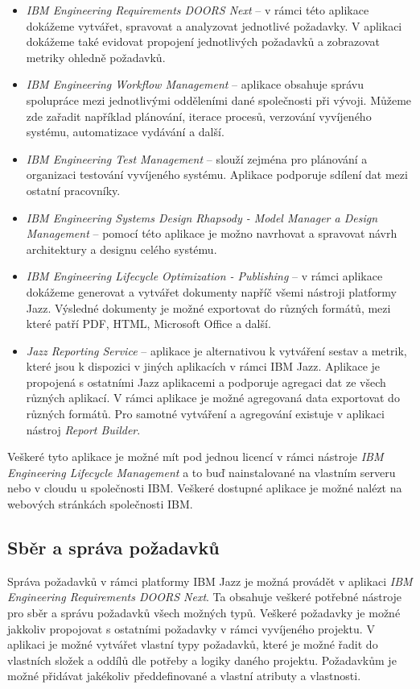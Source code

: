 \documentclass[czech,master]{diploma}
\begin{document}
\begin{itemize}
\item \textit{IBM Engineering Requirements DOORS Next} -- v rámci této aplikace dokážeme vytvářet, spravovat a analyzovat jednotlivé požadavky. V aplikaci dokážeme také evidovat propojení jednotlivých požadavků a zobrazovat metriky ohledně požadavků.
\item \textit{IBM Engineering Workflow Management} -- aplikace obsahuje správu spolupráce mezi jednotlivými odděleními dané společnosti při vývoji. Můžeme zde zařadit například plánování, iterace procesů, verzování vyvíjeného systému, automatizace vydávání a další.
\item \textit{IBM Engineering Test Management} -- slouží zejména pro plánování a organizaci testování vyvíjeného systému. Aplikace podporuje sdílení dat mezi ostatní pracovníky.
\item \textit{IBM Engineering Systems Design Rhapsody - Model Manager a Design Management} -- pomocí této aplikace je možno navrhovat a spravovat návrh architektury a designu celého systému.
\item \textit{IBM Engineering Lifecycle Optimization - Publishing} -- v rámci aplikace dokážeme generovat a vytvářet dokumenty napříč všemi nástroji platformy Jazz. Výsledné dokumenty je možné exportovat do různých formátů, mezi které patří PDF, HTML, Microsoft Office a další.
\item \textit{Jazz Reporting Service} -- aplikace je alternativou k vytváření sestav a metrik, které jsou k dispozici v jiných aplikacích v rámci IBM Jazz. Aplikace je propojená s ostatními Jazz aplikacemi a podporuje agregaci dat ze všech různých aplikací. V rámci aplikace je možné agregovaná data exportovat do různých formátů. Pro samotné vytváření a agregování existuje v aplikaci nástroj \textit{Report Builder}.
\end{itemize}

Veškeré tyto aplikace je možné mít pod jednou licencí v rámci nástroje \textit{IBM Engineering Lifecycle Management} a to buď nainstalované na vlastním serveru nebo v cloudu u společnosti IBM. Veškeré dostupné aplikace je možné nalézt na webových stránkách společnosti IBM. \cite{ref:jazz_products}

\subsection{Sběr a správa požadavků}
Správa požadavků v rámci platformy IBM Jazz je možná provádět v aplikaci \textit{IBM Engineering Requirements DOORS Next}. Ta obsahuje veškeré potřebné nástroje pro sběr a správu požadavků všech možných typů. Veškeré požadavky je možné jakkoliv propojovat s ostatními požadavky v rámci vyvíjeného projektu. V aplikaci je možné vytvářet vlastní typy požadavků, které je možné řadit do vlastních složek a oddílů dle potřeby a logiky daného projektu. Požadavkům je možné přidávat jakékoliv předdefinované a vlastní atributy a vlastnosti.
\end{document}
